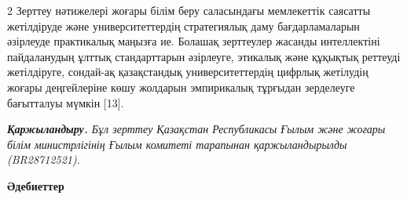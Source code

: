 \begin{multicols}{2}
Зерттеу нәтижелері жоғары білім беру саласындағы мемлекеттік саясатты
жетілдіруде және университеттердің стратегиялық даму бағдарламаларын
әзірлеуде практикалық маңызға ие. Болашақ зерттеулер жасанды
интеллектіні пайдаланудың ұлттық стандарттарын әзірлеуге, этикалық және
құқықтық реттеуді жетілдіруге, сондай-ақ қазақстандық университеттердің
цифрлық жетілудің жоғары деңгейлеріне көшу жолдарын эмпирикалық тұрғыдан
зерделеуге бағытталуы мүмкін {[}13{]}.

\emph{{\bfseries Қаржыландыру.} Бұл зерттеу Қазақстан Республикасы Ғылым
және жоғары білім министрлігінің Ғылым комитеті тарапынан
қаржыландырылды (BR28712521).}
\end{multicols}

\begin{center}
{\bfseries Әдебиеттер}
\end{center}

